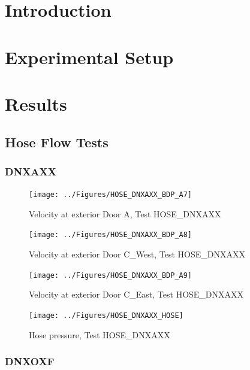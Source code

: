 \documentclass[11pt,oneside]{book}
\begin{document}
\mainmatter

\chapter{Introduction}
\label{chap:Introduction}

\chapter{Experimental Setup}
\label{chap:Experimental_Setup}

\chapter{Results}
\label{chap:Results}

\section{Hose Flow Tests}

\subsection{DNXAXX}

\begin{figure}[!ht]
\texttt{[image: ../Figures/HOSE\_DNXAXX\_BDP\_A7]}
\caption{Velocity at exterior Door A, Test HOSE\_DNXAXX}
\label{fig:HOSE_DNXAXX_BDP_A7}
\end{figure}

\begin{figure}[!ht]
\texttt{[image: ../Figures/HOSE\_DNXAXX\_BDP\_A8]}
\caption{Velocity at exterior Door C\_West, Test HOSE\_DNXAXX}
\label{fig:HOSE_DNXAXX_BDP_A8}
\end{figure}

\begin{figure}[!ht]
\texttt{[image: ../Figures/HOSE\_DNXAXX\_BDP\_A9]}
\caption{Velocity at exterior Door C\_East, Test HOSE\_DNXAXX}
\label{fig:HOSE_DNXAXX_BDP_A9}
\end{figure}

\begin{figure}[!ht]
\texttt{[image: ../Figures/HOSE\_DNXAXX\_HOSE]}
\caption{Hose pressure, Test HOSE\_DNXAXX}
\label{fig:HOSE_DNXAXX_HOSE}
\end{figure}


\clearpage


\subsection{DNXOXF}
\end{document}

